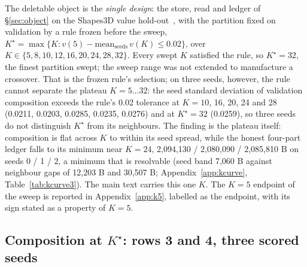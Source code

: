\documentclass{article} %
\newcommand{\Kstar}{\ensuremath{K^{\star}}}
\begin{document}
The deletable object is the \emph{single design}: the store, read and ledger of
\S\ref{sec:object} on the Shapes3D value hold-out~\citep{montero2021role,schott2021visual}, with the partition fixed on validation
by a rule frozen before the sweep, $\Kstar=\max\{K : v(5)-\text{mean}_{\text{seeds}}\,v(K)\le
0.02\}$, over $K\in\{5,8,10,12,16,20,24,28,32\}$. Every swept $K$ satisfied the rule, so
$\Kstar=32$, the finest partition swept; the sweep range was not extended to manufacture a
crossover. %
That is the frozen rule's selection; on three seeds, however, the rule cannot separate the plateau
$K=5\ldots32$: the seed standard deviation of validation composition exceeds the rule's 0.02
tolerance at $K=10$, 16, 20, 24 and 28 (0.0211, 0.0203, 0.0285, 0.0235, 0.0276) and at $\Kstar=32$ %
(0.0259), so three seeds do not distinguish $\Kstar$ from its neighbours. %
The finding is the plateau itself: composition is flat across $K$ to within its seed spread, while
the honest four-part ledger falls to its minimum near $K=24$, 2,094,130 / 2,080,090 / 2,085,810 B %
on seeds 0 / 1 / 2, a minimum that is resolvable (seed band 7,060 B against neighbour gaps of %
12,203 B and 30,507 B; Appendix~\ref{app:kcurve}, Table~\ref{tab:kcurve3}). %
The main text carries this one $K$. The $K=5$ endpoint of the sweep is reported in
Appendix~\ref{app:k5}, labelled as the endpoint, with its sign stated as a property of $K=5$.

\subsection{Composition at $\Kstar$: rows 3 and 4, three scored seeds}
\label{sec:shapes-t7}
\end{document}
